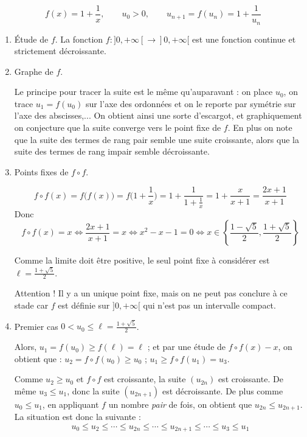 \documentclass[class=report,crop=false]{standalone}
\begin{document}
\begin{exemple}
$$f(x)=1+\frac1x,\qquad u_0 >0, \qquad u_{n+1} = f(u_n)= 1 + \frac{1}{u_n}$$


\begin{enumerate}
  \item \'Etude de $f$. La fonction $f : ]0,+\infty[\to ]0,+\infty[$ est
  une fonction continue et strictement décroissante.

  \item Graphe de $f$.


Le principe pour tracer la suite est le même qu'auparavant : on place $u_0$,
on trace $u_1=f(u_0)$ sur l'axe des ordonnées et on le reporte par symétrie sur l'axe des abscisses,...
On obtient ainsi une sorte d'escargot, et graphiquement on conjecture que la suite converge
vers le point fixe de $f$. En plus on note que la suite des termes de rang pair semble une suite croissante,
alors que la suite des termes de rang impair semble décroissante.

  \item Points fixes de $f\circ f$.

  $$f\circ f(x)= f\big( f(x)\big)= f\big(1+\frac1x\big)= 1+ \frac{1}{1+\frac1x}=1+\frac{x}{x+1} = \frac{2x+1}{x+1}$$
  Donc
  $$f\circ f(x)=x \iff  \frac{2x+1}{x+1} = x \iff x^2-x-1=0 \iff x \in
\left\{\frac{1-\sqrt{5}}{2},\frac{1+\sqrt{5}}{2}\right\}$$

  Comme la limite doit être positive, le seul point fixe à considérer est $\ell=\frac{1+\sqrt{5}}{2}$.

  Attention ! Il y a un unique point fixe, mais on ne peut pas conclure à ce stade car $f$ est définie sur $]0,+\infty[$ qui n'est pas un intervalle compact.

  \item Premier cas $0 < u_0 \le \ell = \frac{1+\sqrt{5}}{2}$.

  Alors,  $u_1 = f(u_0) \ge f(\ell)=\ell$ ; et par une étude de $f\circ f(x)-x$, on obtient que  :  $u_2 = f\circ f(u_0) \ge u_0$ ; $u_1  \ge f\circ f(u_1)=u_3$.

  Comme $u_2 \ge u_0$ et $f\circ f$ est croissante, la suite $(u_{2n})$ est croissante.
  De même $u_3  \le u_1$, donc la suite $(u_{2n+1})$ est décroissante.
  De plus comme  $u_0 \le u_1$, en appliquant $f$ un nombre \emph{pair} de fois, on obtient que $u_{2n} \le u_{2n+1}$.
  La situation est donc la suivante :
  $$u_0 \le u_2 \le \cdots \le u_{2n} \le \cdots \le u_{2n+1} \le \cdots \le u_3 \le u_1$$


\end{enumerate}
\end{exemple}
\end{document}
